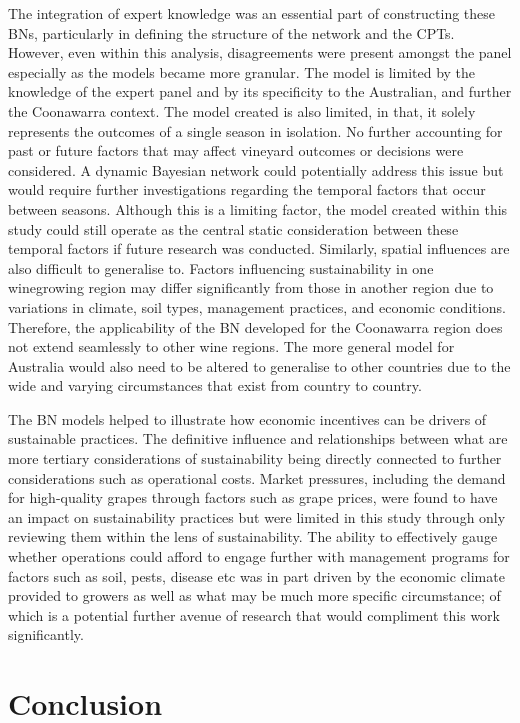 The integration of expert knowledge was an essential part of constructing these BNs, particularly in defining the structure of the network and the CPTs. However, even within this analysis, disagreements were present amongst the panel especially as the models became more granular. The model is limited by the knowledge of the expert panel and by its specificity to the Australian, and further the Coonawarra context. The model created is also limited, in that, it solely represents the outcomes of a single season in isolation. No further accounting for past or future factors that may affect vineyard outcomes or decisions were considered. A dynamic Bayesian network could potentially address this issue but would require further investigations regarding the temporal factors that occur between seasons. Although this is a limiting factor, the model created within this study could still operate as the central static consideration between these temporal factors if future research was conducted. Similarly, spatial influences are also difficult to generalise to. Factors influencing sustainability in one winegrowing region may differ significantly from those in another region due to variations in climate, soil types, management practices, and economic conditions. Therefore, the applicability of the BN developed for the Coonawarra region does not extend seamlessly to other wine regions. The more general model for Australia would also need to be altered to generalise to other countries due to the wide and varying circumstances that exist from country to country.

The BN models helped to illustrate how economic incentives can be drivers of sustainable practices. The definitive influence and relationships between what are more tertiary considerations of sustainability being directly connected to further considerations such as operational costs. Market pressures, including the demand for high-quality grapes through factors such as grape prices, were found to have an impact on sustainability practices but were limited in this study through only reviewing them within the lens of sustainability. The ability to effectively gauge whether operations could afford to engage further with management programs for factors such as soil, pests, disease etc was in part driven by the economic climate provided to growers as well as what may be much more specific circumstance; of which is a potential further avenue of research that would compliment this work significantly.

\section{Conclusion}

